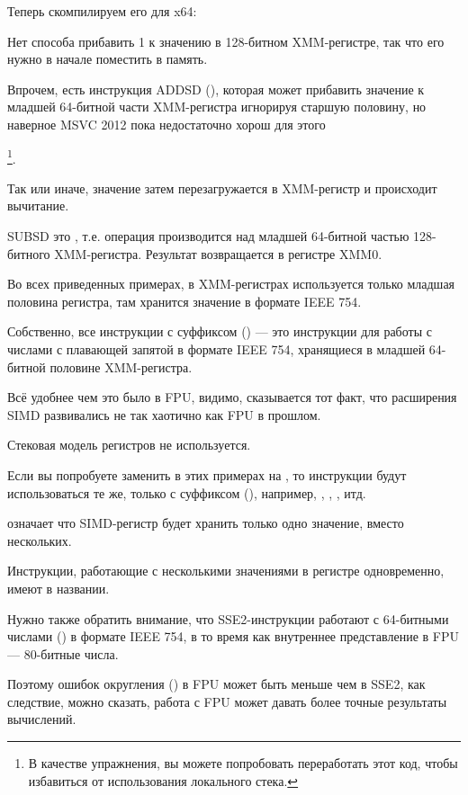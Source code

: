 Теперь скомпилируем его для x64:



Нет способа прибавить 1 к значению в 128-битном XMM-регистре, так что его нужно в начале поместить в память.

Впрочем, есть инструкция ADDSD (),
которая может прибавить значение к младшей 64-битной части XMM-регистра игнорируя старшую половину,
но наверное MSVC 2012 пока недостаточно хорош для этого

\footnote{В качестве упражнения, вы можете попробовать переработать этот код, чтобы избавиться 
от использования локального стека.}.

Так или иначе, значение затем перезагружается в XMM-регистр и происходит вычитание.

SUBSD это , 
т.е. операция производится над младшей 64-битной частью 128-битного XMM-регистра.
Результат возвращается в регистре XMM0.




Во всех приведенных примерах, в XMM-регистрах используется только младшая половина регистра, там
хранится значение в формате IEEE 754.

Собственно, все инструкции с суффиксом 
 () --- это инструкции для работы с числами с плавающей 
запятой в формате IEEE 754, 
хранящиеся в младшей 64-битной половине XMM-регистра.

Всё удобнее чем это было в FPU, видимо, сказывается тот факт, что расширения 
SIMD развивались не так хаотично как FPU в прошлом.

Стековая модель регистров не используется.

Если вы попробуете заменить в этих примерах \Tdouble на \Tfloat{}, то инструкции будут использоваться те же,
только с суффиксом
(), например, , , , итд.

 означает что SIMD-регистр будет хранить только одно значение, вместо нескольких.

Инструкции, работающие с несколькими значениями в регистре одновременно, имеют  в названии.

Нужно также обратить внимание, что SSE2-инструкции работают с 64-битными числами (\Tdouble) в формате IEEE 754,
в то время как внутреннее представление в FPU --- 80-битные числа.

Поэтому ошибок округления () в FPU может быть меньше чем в SSE2,
как следствие, можно сказать, работа с FPU может давать более точные результаты вычислений.

